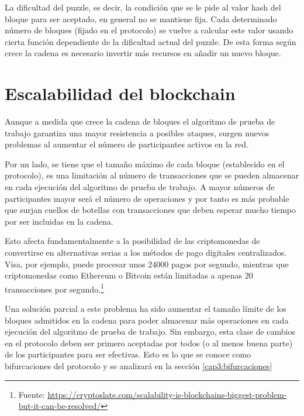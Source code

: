 La dificultad del puzzle, es decir, la condición que se le pide al valor hash del bloque para ser aceptado, en general no se mantiene fija. Cada determinado número de bloques (fijado en el protocolo) se vuelve a calcular este valor usando cierta función dependiente de la dificultad actual del puzzle. De esta forma según crece la cadena es necesario invertir más recursos en añadir un nuevo bloque.

\section{Escalabilidad del blockchain}
Aunque a medida que crece la cadena de bloques el algoritmo de prueba de trabajo garantiza una mayor resistencia a posibles ataques, surgen nuevos problemas al aumentar el número de participantes activos en la red.

Por un lado, se tiene que el tamaño máximo de cada bloque (establecido en el protocolo), es una limitación al número de transacciones que se pueden almacenar en cada ejecución del algoritmo de prueba de trabajo. A mayor números de participantes mayor será el número de operaciones y por tanto es más probable que surjan cuellos de botellas con transacciones que deben esperar mucho tiempo por ser incluidas en la cadena.

Esto afecta fundamentalmente a la posibilidad de las criptomonedas de convertirse en alternativas serias a los métodos de pago digitales centralizados. Visa, por ejemplo, puede procesar unos 24000 pagos por segundo, mientras que criptomonedas como Ethereum o Bitcoin están limitadas a apenas 20 transacciones por segundo.\footnote{Fuente: \url{https://cryptoslate.com/scalability-is-blockchains-biggest-problem-but-it-can-be-resolved/}}

Una solución parcial a este problema ha sido aumentar el tamaño límite de los bloques admitidos en la cadena para poder almacenar más operaciones en cada ejecución del algoritmo de prueba de trabajo. Sin embargo, esta clase de cambios en el protocolo deben ser primero aceptadas por todos (o al menos buena parte) de los participantes para ser efectivas. Esto es lo que se conoce como bifurcaciones del protocolo y se analizará en la sección \ref{cap3:bifurcaciones}

